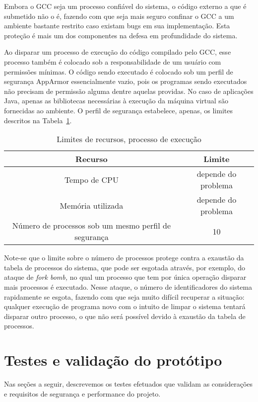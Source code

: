 \documentclass[ruledheader, 12pt]{abnt}
\newcommand{\tblref}[1]{Tabela~\ref{tbl:#1}}
\begin{document}
Embora o GCC seja um processo confiável do sistema, o código externo a que é submetido não o é, fazendo com que seja mais seguro confinar o GCC a um ambiente bastante restrito caso existam bugs em sua implementação. Esta proteção é mais um dos componentes na defesa em profundidade do sistema.

Ao disparar um processo de execução do código compilado pelo GCC, esse processo também é colocado sob a responsabilidade de um usuário com permissões mínimas. O código sendo executado é colocado sob um perfil de segurança AppArmor essencialmente vazio, pois os programas sendo executados não precisam de permissão alguma dentre aquelas providas. No caso de aplicações Java, apenas as bibliotecas necessárias à execução da máquina virtual são fornecidas ao ambiente. O perfil de segurança estabelece, apenas, os limites descritos na \tblref{execution-limits}.

\begin{table}[h]
	\centering
	\caption{\label{tbl:execution-limits}Limites de recursos, processo de execução}
	\begin{tabular}{c c}\hline
		\hline
		Recurso & Limite \\\hline
		\hline
		Tempo de CPU & depende do problema \\\hline
		Memória utilizada & depende do problema \\\hline
		Número de processos sob um mesmo perfil de segurança & 10 \\\hline
		\hline
	\end{tabular}
\end{table}

Note-se que o limite sobre o número de processos protege contra a exaustão da tabela de processos do sistema, que pode ser esgotada através, por exemplo, do ataque de \emph{fork bomb,} no qual um processo que tem por única operação disparar mais processos é executado. Nesse ataque, o número de identificadores do sistema rapidamente se esgota, fazendo com que seja muito difícil recuperar a situação: qualquer execução de programa novo com o intuito de limpar o sistema tentará disparar outro processo, o que não será possível devido à exaustão da tabela de processos.

\section{Testes e validação do protótipo}

Nas seções a seguir, descrevemos os testes efetuados que validam as considerações e requisitos de segurança e performance do projeto.
\end{document}
